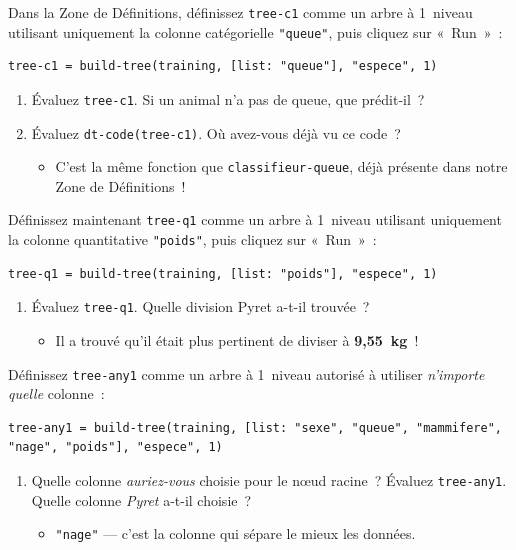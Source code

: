 \documentclass[12pt,a4paper]{article}
\begin{document}
\begin{activitybox}
  Dans la Zone de Définitions, définissez \texttt{tree-c1} comme un arbre à 1~niveau utilisant uniquement la colonne catégorielle \texttt{"queue"}, puis cliquez sur «~Run~»~:
  \begin{lstlisting}
tree-c1 = build-tree(training, [list: "queue"], "espece", 1)
  \end{lstlisting}

  \begin{enumerate}[leftmargin=*]
    \item Évaluez \texttt{tree-c1}. Si un animal n'a pas de queue, que prédit-il~?
    \item Évaluez \texttt{dt-code(tree-c1)}. Où avez-vous déjà vu ce code~?
    \begin{itemize}
      \item C'est la même fonction que \texttt{classifieur-queue}, déjà présente dans notre Zone de Définitions~!
    \end{itemize}
  \end{enumerate}

  Définissez maintenant \texttt{tree-q1} comme un arbre à 1~niveau utilisant uniquement la colonne quantitative \texttt{"poids"}, puis cliquez sur «~Run~»~:
  \begin{lstlisting}
tree-q1 = build-tree(training, [list: "poids"], "espece", 1)
  \end{lstlisting}

  \begin{enumerate}[leftmargin=*, resume]
    \item Évaluez \texttt{tree-q1}. Quelle division Pyret a-t-il trouvée~?
    \begin{itemize}
      \item Il a trouvé qu'il était plus pertinent de diviser à \textbf{9,55~kg}~!
    \end{itemize}
  \end{enumerate}

  Définissez \texttt{tree-any1} comme un arbre à 1~niveau autorisé à utiliser \emph{n'importe quelle} colonne~:
  \begin{lstlisting}
tree-any1 = build-tree(training, [list: "sexe", "queue", "mammifere", "nage", "poids"], "espece", 1)
  \end{lstlisting}

  \begin{enumerate}[leftmargin=*, resume]
    \item Quelle colonne \emph{auriez-vous} choisie pour le nœud racine~? Évaluez \texttt{tree-any1}. Quelle colonne \emph{Pyret} a-t-il choisie~?
    \begin{itemize}
      \item \texttt{"nage"} — c'est la colonne qui sépare le mieux les données.
    \end{itemize}
  \end{enumerate}
\end{activitybox}
\end{document}
